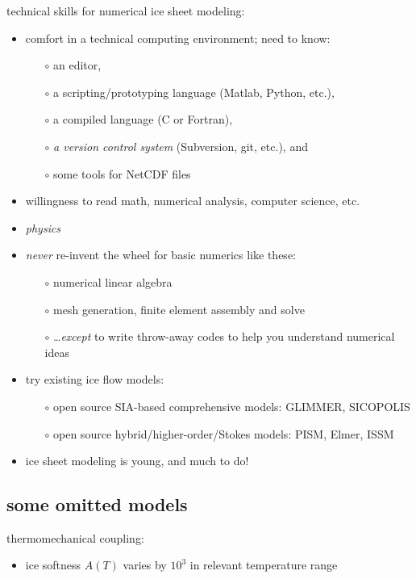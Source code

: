 \documentclass[titlepage,letterpaper,final,12pt]{scrartcl}
\begin{document}
technical skills for numerical ice sheet modeling:

\begin{itemize}
\item comfort in a technical computing environment; need to know:
  \begin{itemize}\small
  \item[$\circ$] an editor,
  \item[$\circ$] a scripting/prototyping language (Matlab, Python, etc.),
  \item[$\circ$] a compiled language (C or Fortran),
  \item[$\circ$] \emph{a version control system} (Subversion, git, etc.), and
  \item[$\circ$] some tools for NetCDF files
  \normalsize
  \end{itemize}
\item willingness to read math, numerical analysis, computer science, etc.
\item \emph{physics}
\item \emph{never} re-invent the wheel for basic numerics like these:
  \begin{itemize}
  \item[$\circ$] numerical linear algebra
  \item[$\circ$] mesh generation, finite element assembly and solve
  \item[$\circ$] \dots \emph{except} to write throw-away codes to help you understand numerical ideas 
  \end{itemize}
\item try existing ice flow models:
  \begin{itemize}
  \item[$\circ$] open source SIA-based comprehensive models: GLIMMER, SICOPOLIS
  \item[$\circ$] open source hybrid/higher-order/Stokes models: PISM, Elmer, ISSM
  \end{itemize}
\item ice sheet modeling is young, and much to do!
\end{itemize}


\subsection{some omitted models}

thermomechanical coupling:

\begin{itemize}
\item ice softness $A(T)$ varies by $10^3$ in relevant temperature range
\end{itemize}
\end{document}
